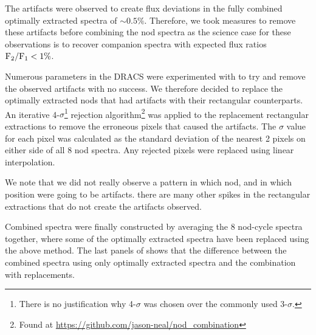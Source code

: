 The artifacts were observed to create flux deviations in the fully combined optimally extracted spectra of \(\sim 0.5\% \). Therefore, we took measures to remove these artifacts before combining the nod spectra as the science case for these observations is to recover companion spectra with expected flux ratios \(\rm {F_2}/{F_1} < 1\% \). 

Numerous parameters in the DRACS were experimented with to try and remove the observed artifacts with no success. We therefore decided to replace the optimally extracted nods that had artifacts with their rectangular counterparts. 
An iterative 4-\(\sigma \)\footnote{There is no justification why 4-\(\sigma\) was chosen over the commonly used 3-\(\sigma\).} rejection algorithm\footnote{Found at \url{https://github.com/jason-neal/nod_combination}} was applied to the replacement rectangular extractions to remove the erroneous pixels that caused the artifacts. The \(\sigma\) value for each pixel was calculated as the standard deviation of the nearest 2 pixels on either side of all 8 nod spectra. Any rejected pixels were replaced using linear interpolation.

We note that we did not really observe a pattern in which nod, and in which position were going to be artifacts. there are many other spikes in the rectangular extractions that do not create the artifacts observed. 

Combined spectra were finally constructed by averaging the 8 nod-cycle spectra together, where some of the optimally extracted spectra have been replaced using the above method. The last panels of  shows that the difference between the combined spectra using only optimally extracted spectra and the combination with replacements.

